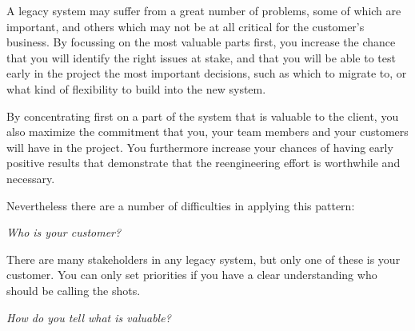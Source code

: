 \documentclass[a4paper,10pt,twoside]{book}
\begin{document}


\discussion
A legacy system may suffer from a great number of problems, some of which are important, and others which may not be at all critical for the customer's business. By focussing on the most valuable parts first, you increase the chance that you will identify the right issues at stake, and that you will be able to test early in the project the most important decisions, such as which  to migrate to, or what kind of flexibility to build into the new system.

By concentrating first on a part of the system that is valuable to the client, you also maximize the commitment that you, your team members and your customers will have in the project. You furthermore increase your chances of having early positive results that demonstrate that the reengineering effort is worthwhile and necessary.

Nevertheless there are a number of difficulties in applying this pattern:

\emph{Who is your customer?}

\begin{bulletlist}
  \item There are many stakeholders in any legacy system, but only one of these is your customer. You can only set priorities if you have a clear understanding who should be calling the shots.
\end{bulletlist}

\emph{How do you tell what is valuable?}
\end{document}
